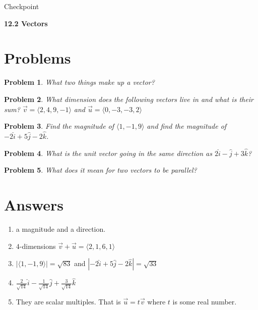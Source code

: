 \documentclass[11pt]{article}
\newtheorem{problem}{Problem}
\newcommand{\vs}{\vspace*{.1in}}
\begin{document}
\begin{huge}
    \begin{center}
        Checkpoint
    \end{center}
\end{huge}
\begin{large}\begin{center}\bf 12.2 Vectors \end{center}
\end{large}

\vs\vs
\section{Problems}

\begin{problem}
What two things make up a vector?
\end{problem}

\begin{problem}
What dimension does the following vectors live in and what is their sum?  $ \vec{v}= \langle 2,4,9,-1 \rangle$ and $\vec{u} = \langle 0,-3,-3,2\rangle$
\end{problem}

\begin{problem}
Find the magnitude of $\langle 1,-1,9 \rangle$ and find the magnitude of $-2\hat{i}+5\hat{j}-2\hat{k}$.
\end{problem}

\begin{problem}
What is the unit vector going in the same direction as $2\hat{i}-\hat{j}+3\hat{k}$?
\end{problem}

\begin{problem}
What does it mean for two vectors to be parallel?
\end{problem}

\newpage

\section{Answers}

\begin{enumerate}
    \item a magnitude and a direction.
    \item $4$-dimensions $\vec{v}+\vec{u} = \langle 2,1,6,1\rangle$
    \item $|\langle 1,-1,9 \rangle|=\sqrt{83}$ and $|-2\hat{i}+5\hat{j}-2\hat{k}| = \sqrt{33}$
    \item $\frac{2}{\sqrt{14}}\hat{i}-\frac{1}{\sqrt{14}}\hat{j}+\frac{3}{\sqrt{14}}\hat{k}$
    \item They are scalar multiples. That is $\vec{u} = t \vec{v}$ where $t$ is some real number.
\end{enumerate}
\end{document}
